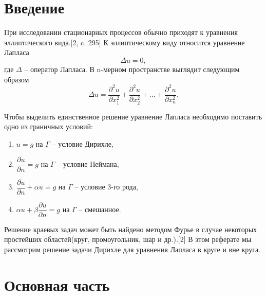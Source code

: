 \documentclass[14pt, a4paper]{extarticle}
\begin{document}
	
	\pagebreak
	
	\section{Введение}
		При исследовании стационарных процессов  обычно приходят к уравнения эллиптического вида.[2, c. 295] К эллиптическому виду относится уравнение Лапласа
		\begin{equation*}
			\Delta u = 0, 
		\end{equation*}
		где $\Delta$ -- оператор Лапласа. В n-мерном пространстве выглядит следующим образом
		\begin{equation}
			\Delta u = \dfrac{\partial^2 u}{\partial x^2_1} + \dfrac{\partial^2 u}{\partial x^2_2} + ... +   \dfrac{\partial^2 u}{\partial x^2_n}. 
		\end{equation}
		
		Чтобы выделить единственное решение уравнение Лапласа необходимо поставить одно из граничных условий:
		\begin{enumerate}
			\item $u = g$ на $\Gamma$ -- условие Дирихле,
			\item $\dfrac{\partial u}{\partial n} = g$ на $\Gamma$ -- условие Неймана,
			\item $\dfrac{\partial u}{\partial n}  + \alpha u = g$ на $\Gamma$ -- условие 3-го рода,
			\item $ \alpha u + \beta\dfrac{\partial u}{\partial n}  = g$ на $\Gamma$ -- смешанное.
		\end{enumerate}
		
		Решение краевых задач может быть найдено методом Фурье в случае некоторых простейших областей(круг, промоугольник, шар и др.).[2] В этом реферате мы рассмотрим решение задачи Дирихле для уравнения Лапласа в круге и вне круга.

	\section{Основная часть}
\end{document}

